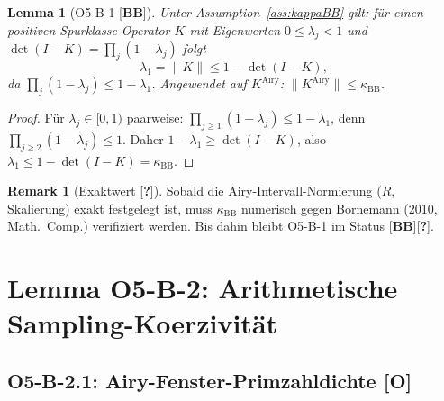 \documentclass[12pt,a4paper]{amsart}
\newcommand{\statusO}{{\color{red}[\textbf{O}]}}
\newcommand{\statusBB}{{\color{blue}[\textbf{BB}]}}
\newcommand{\statusQ}{{\color{red}[\textbf{?}]}}
\newtheorem{lemma}[theorem]{Lemma}
\theoremstyle{definition}
\newtheorem{remark}[theorem]{Remark}
\newcommand{\KAiry}{K^{\mathrm{Airy}}}
\newcommand{\kappaBB}{\kappa_{\mathrm{BB}}}
\newcommand{\norm}[1]{\lVert #1 \rVert}
\begin{document}
\begin{lemma}[O5-B-1 \statusBB]
\label{lem:O5B1}
Unter Assumption~\ref{ass:kappaBB} gilt: für einen positiven Spurklasse-Operator
$K$ mit Eigenwerten $0 \le \lambda_j < 1$ und
$\det(I-K) = \prod_j(1-\lambda_j)$ folgt
\[
  \lambda_1 = \norm{K} \le 1 - \det(I-K),
\]
da $\prod_j(1-\lambda_j) \le 1 - \lambda_1$.
Angewendet auf $\KAiry$: $\norm{\KAiry} \le \kappaBB$.
\end{lemma}

\begin{proof}
Für $\lambda_j \in [0,1)$ paarweise: $\prod_{j\ge 1}(1-\lambda_j) \le 1-\lambda_1$,
denn $\prod_{j\ge 2}(1-\lambda_j) \le 1$. Daher $1-\lambda_1 \ge \det(I-K)$,
also $\lambda_1 \le 1 - \det(I-K) = \kappaBB$.
\end{proof}

\begin{remark}[Exaktwert \statusQ]
\label{rem:exact_value}
Sobald die Airy-Intervall-Normierung ($R$, Skalierung) exakt festgelegt ist,
muss $\kappaBB$ numerisch gegen Bornemann (2010, Math.\ Comp.) verifiziert werden.
Bis dahin bleibt O5-B-1 im Status \statusBB\statusQ.
\end{remark}

\section{Lemma O5-B-2: Arithmetische Sampling-Koerzivität}
\label{sec:O5B2}

\subsection{O5-B-2.1: Airy-Fenster-Primzahldichte \statusO}
\label{sec:O5B21}
\end{document}
